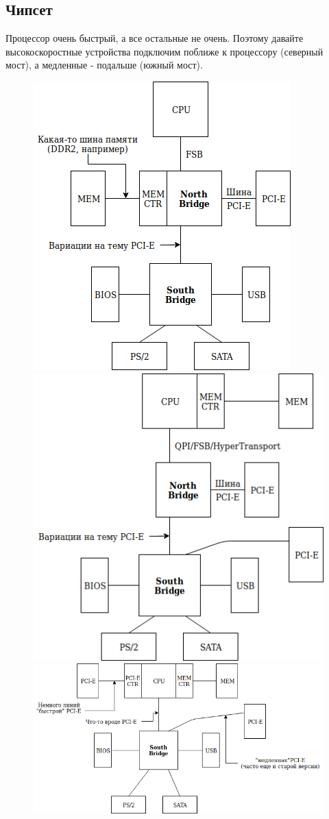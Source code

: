 \documentclass[12pt, a4paper]{article}
\begin{document}
\subsection{Чипсет}
Процессор очень быстрый, а все остальные не очень. Поэтому давайте высокоскоростные устройства подключим поближе к процессору (северный мост), а медленные - подальше (южный мост).
\begin{figure}[h]
    \centering
    \includegraphics[scale=0.3]{./images/NBSB.png}
    \includegraphics[scale=0.3]{./images/NBSB1.png}
    \includegraphics[scale=0.3]{./images/NBSB2.png}

\end{figure}
\end{document}
